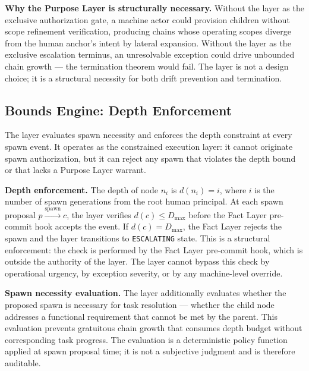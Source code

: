 \medskip
\noindent\textbf{Why the Purpose Layer is structurally necessary.}
Without the \purpose{} layer as the exclusive authorization gate, a machine actor could provision children without scope refinement verification, producing chains whose operating scopes diverge from the human anchor's intent by lateral expansion. Without the \purpose{} layer as the exclusive escalation terminus, an unresolvable exception could drive unbounded chain growth — the termination theorem would fail. The \purpose{} layer is not a design choice; it is a structural necessity for both drift prevention and termination.

\subsection{Bounds Engine: Depth Enforcement}
\label{sec:integration-bounds}

The \bounds{} layer evaluates spawn necessity and enforces the depth constraint at every spawn event. It operates as the constrained execution layer: it cannot originate spawn authorization, but it can reject any spawn that violates the depth bound or that lacks a Purpose Layer warrant.

\medskip
\noindent\textbf{Depth enforcement.}
The depth of node $n_i$ is $d(n_i) = i$, where $i$ is the number of spawn generations from the root human principal. At each spawn proposal $p \xrightarrow{\mathrm{spawn}} c$, the \bounds{} layer verifies $d(c) \leq D_{\max}$ before the Fact Layer pre-commit hook accepts the event. If $d(c) = D_{\max}$, the Fact Layer rejects the spawn and the \bounds{} layer transitions to \texttt{ESCALATING} state. This is a structural enforcement: the check is performed by the Fact Layer pre-commit hook, which is outside the authority of the \bounds{} layer. The \bounds{} layer cannot bypass this check by operational urgency, by exception severity, or by any machine-level override.

\medskip
\noindent\textbf{Spawn necessity evaluation.}
The \bounds{} layer additionally evaluates whether the proposed spawn is necessary for task resolution — whether the child node addresses a functional requirement that cannot be met by the parent. This evaluation prevents gratuitous chain growth that consumes depth budget without corresponding task progress. The evaluation is a deterministic policy function applied at spawn proposal time; it is not a subjective judgment and is therefore auditable.

